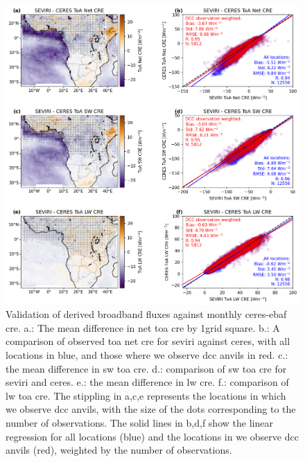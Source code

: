 \begin{figure}[tp]
    \includegraphics[width=\textwidth]{figures/ch3_03.png}
    \caption[
    Validation of derived broadband fluxes against monthly \acrshort{ceres}-\acrshort{ebaf} \acrshort{cre}
    ]{
    Validation of derived broadband fluxes against monthly \acrshort{ceres}-\acrshort{ebaf} \acrshort{cre}. a.: The mean difference in net \acrshort{toa} \acrshort{cre} by 1\textdegree grid square. b.: A comparison of observed \acrshort{toa} net \acrshort{cre} for \acrshort{seviri} against \acrshort{ceres}, with all locations in blue, and those where we observe \acrshort{dcc} anvils in red. c.: the mean difference in \acrshort{sw} \acrshort{toa} \acrshort{cre}. d.: comparison of \acrshort{sw} \acrshort{toa} \acrshort{cre} for \acrshort{seviri} and \acrshort{ceres}. e.: the mean difference in \acrshort{lw} \acrshort{cre}. f.: comparison of \acrshort{lw} \acrshort{toa} \acrshort{cre}. The stippling in a,c,e represents the locations in which we observe \acrshort{dcc} anvils, with the size of the dots corresponding to the number of observations. The solid lines in b,d,f show the linear regression for all locations (blue) and the locations in we observe \acrshort{dcc} anvils (red), weighted by the number of observations.
    }
    \label{fig:flux_validation}
\end{figure}


